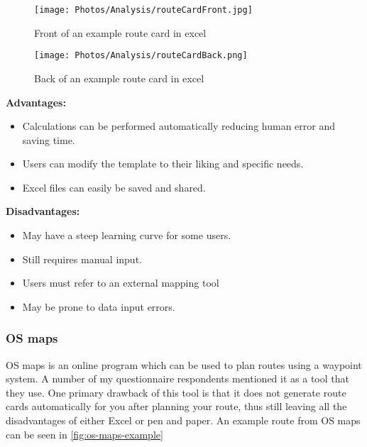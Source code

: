 \documentclass{article}
\newcommand{\Adv}{\bigskip\textbf{Advantages: }}
\newcommand{\Dis}{\bigskip\textbf{Disadvantages: }}
\begin{document}
            \begin{figure}[ht]
                \centering
                \texttt{[image: Photos/Analysis/routeCardFront.jpg]}
                \caption{Front of an example route card in excel}
                \label{fig:route-front}
            \end{figure}

            \begin{figure}[ht]
                \centering
                \texttt{[image: Photos/Analysis/routeCardBack.png]}
                \caption{Back of an example route card in excel}
                \label{fig:route-back}
            \end{figure}
            
            \Adv
            \begin{itemize}
                \item Calculations can be performed automatically reducing human error and saving time.
                \item Users can modify the template to their liking and specific needs.
                \item Excel files can easily be saved and shared.
            \end{itemize}

            \Dis
            \begin{itemize}
                \item May have a steep learning curve for some users.
                \item Still requires manual input.
                \item Users must refer to an external mapping tool
                \item May be prone to data input errors.
            \end{itemize}

        \subsubsection{OS maps}

            OS maps is an online program which can be used to plan routes using a waypoint system. A number of my questionnaire respondents mentioned it as a tool that they use. One primary drawback of this tool is that it does not generate route cards automatically for you after planning your route, thus still leaving all the disadvantages of either Excel or pen and paper. An example route from OS maps can be seen in \cref{fig:os-maps-example}
\end{document}
